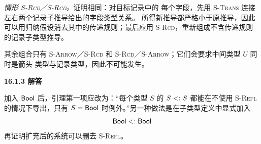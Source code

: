 \begin{taplauthorsolutionentrybox}

\emph{情形 \textsc{S-Rcd}／\textsc{S-Rcd}。}证明相同：对目标记录中的
每个字段，先用 \textsc{S-Trans} 连接左右两个记录子推导给出的字段类型关系。
所得新推导都严格小于原推导，因此可以用归纳假设消去其中的传递规则；最后应用
\textsc{S-Rcd}，重新组成不含传递规则的记录子类型推导。

其余组合只有 \textsc{S-Arrow}／\textsc{S-Rcd} 和
\textsc{S-Rcd}／\textsc{S-Arrow}；它们会要求中间类型 \(U\) 同时是箭头
类型与记录类型，因此不可能发生。

\end{taplauthorsolutionentrybox}

\begin{taplauthorsolutionentrybox}
\label{sol:author:16.1.3}
\textbf{16.1.3 解答}

加入 \(\mathsf{Bool}\) 后，引理第一项应改为：“每个类型 \(S\) 的
\(S\mathrel{<:} S\) 都能在不使用 \textsc{S-Refl} 的情况下导出，只有
\(S=\mathsf{Bool}\) 时例外。”另一种做法是在子类型定义中显式加入
\[
  \mathsf{Bool}\mathrel{<:}\mathsf{Bool}
\]
再证明扩充后的系统可以删去 \textsc{S-Refl}。


\end{taplauthorsolutionentrybox}

